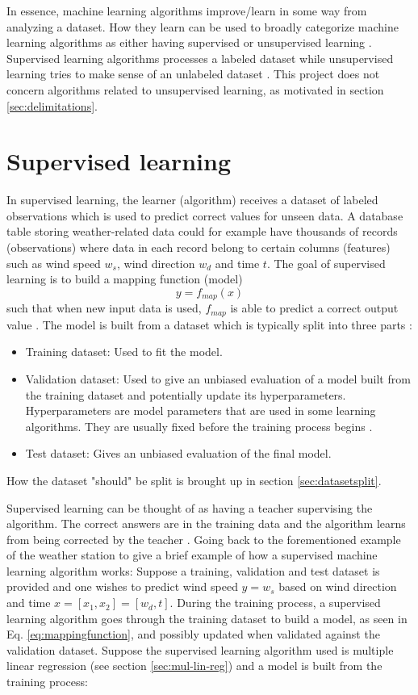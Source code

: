 	In essence, machine learning algorithms improve/learn in some way from analyzing a dataset. How they learn can be used to broadly categorize machine learning algorithms as either having supervised or unsupervised learning \cite{BOOK:1}. Supervised learning algorithms processes a labeled dataset while unsupervised learning tries to make sense of an unlabeled dataset \cite{BOOK:3}. This project does not concern algorithms related to unsupervised learning, as motivated in section \ref{sec:delimitations}.


\section{Supervised learning} \label{sec:supervisedlearning}
	In supervised learning, the learner (algorithm) receives a dataset of labeled observations which is used to predict correct values for unseen data\cite{BOOK:3}. A database table storing weather-related data could for example have thousands of records (observations) where data in each record belong to certain columns (features) such as wind speed $w_s$, wind direction $w_d$ and time $t$. The goal of supervised learning is to build a mapping function (model)
\begin{equation} \label{eq:mappingfunction}
	y = f_{map}(x)
\end{equation}
such that when new input data is used, $f_{map}$ is able to predict a correct output value \cite{WEBSITE:3}. The model is built from a dataset which is typically split into three parts \cite{WEBSITE:4}:

\begin{itemize}
	\item {Training dataset:} Used to fit the model.
	\item {Validation dataset:} Used to give an unbiased evaluation of a model built from the training dataset and potentially update its hyperparameters. Hyperparameters are model parameters that are used in some learning algorithms. They are usually fixed before the training process begins \cite{WEBSITE:7}.
	\item {Test dataset:} Gives an unbiased evaluation of the final model.
\end{itemize}
	How the dataset "should" be split is brought up in section \ref{sec:datasetsplit}. 

	Supervised learning can be thought of as having a teacher supervising the algorithm. The correct answers are in the training data and the algorithm learns from being corrected by the teacher \cite{WEBSITE:3}. Going back to the forementioned example of the weather station to give a brief example of how a supervised machine learning algorithm works: Suppose a training, validation and test dataset is provided and one wishes to predict wind speed $y = w_s$ based on wind direction and time $x = [x_1, x_2] = [w_d, t]$. During the training process, a supervised learning algorithm goes through the training dataset to build a model, as seen in Eq. \ref{eq:mappingfunction}, and possibly updated when validated against the validation dataset. Suppose the supervised learning algorithm used is multiple linear regression (see section \ref{sec:mul-lin-reg}) and a model is built from the training process: 

